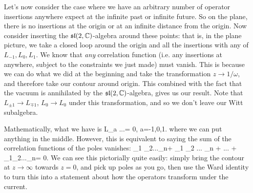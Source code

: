 Let's now consider the case where we have an arbitrary number of operator insertions anywhere expect at the infinite past or infinite future. So on the plane, there is no insertions at the origin or at an infinite distance from the origin. Now consider inserting the $\mathfrak{sl}(2,\mathbb{C})$-algebra around these points: that is, in the plane picture, we take a closed loop around the origin and all the insertions with any of $L_{-1},L_0,L_1$. We know that \textit{any} correlation function (i.e. any insertions at anywhere, subject to the constraints we just made) must vanish. This is because we can do what we did at the beginning and take the transformation $z\to 1/\omega$, and therefore take our contour around  origin. This combined with the fact that the vacuum is annihilated by the $\mathfrak{sl}(2,\mathbb{C})$-algebra, gives us our result.  Note that $L_{\pm1} \to L_{\mp1}$, $L_0\to L_0$ under this transformation, and so we don't leave our Witt subalgebra. 

Mathematically, what we have is 
\bse 
    \langle L_a ...\rangle = 0, \qquad \forall a=-1,0,1.
\ese 
where we can put anything in the middle. However, this is equivalent to saying the sum of the correlation functions of the poles vanishes:
\be 
    \langle \del \cO_1 \cO_2...\cO_n\rangle + \langle \cO_1 \del\cO_2 ... \cO_n \rangle + ... + \langle \cO_1\cO_2...\del\cO_n\rangle = 0.
\ee 
We can see this pictorially quite easily: simply bring the contour at $z\to\infty$ towards $z=0$, and pick up poles as you go, then use the Ward identity to turn this into a statement about how the operators transform under the current.

